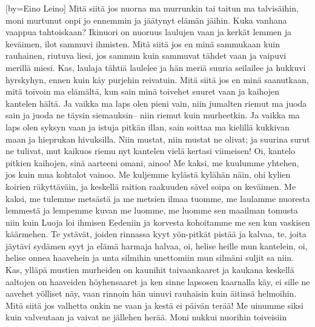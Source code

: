 \sclearpage
{}[by={Eino Leino}]
  \beginverse
    Mitä siitä jos nuorna ma murrunkin
    tai taitun ma talvisäihin,
    moni murtunut onpi jo ennemmin
    ja jäätynyt elämän jäihin.
    Kuka vanhana vaappua tahtoiskaan?
    Ikinuori on nuoruus laulujen vaan
    ja kerkät lemmen ja keväimen,
    ilot sammuvi ihmisten.
  \endverse
  \beginverse
    Mitä siitä jos en minä sammukaan
    kuin rauhainen, riutuva liesi,
    jos sammun kuin sammuvat tähdet vaan
    ja vaipuvi merillä miesi.
    Kas, laulaja tähtiä laulelee
    ja hän meriä suuria seilailee
    ja hukkuvi hyrskyhyn, ennen kuin
    käy purjehin reivatuin.
  \endverse
  \beginverse
    Mitä siitä jos en minä saanutkaan,
    mitä toivoin ma elämältä,
    kun sain minä toivehet suuret vaan
    ja kaihojen kantelen hältä.
    Ja vaikka ma laps olen pieni vain,
    niin jumalten riemut ma juoda sain
    ja juoda ne täysin siemauksin--
    niin riemut kuin murheetkin.
  \endverse
  \beginverse
    Ja vaikka ma laps olen syksyn vaan
    ja istuja pitkän illan,
    sain soittaa ma kielillä kukkivan maan
    ja hieprukan hivuksilla.
    Niin mustat, niin mustat ne olivat;
    ja suurina surut ne tulivat,
    mut kaikuos riemu nyt kantelen
    vielä kertasi viimeisen!
  \endverse
  \beginverse
    Oi, kantelo pitkien kaihojen,
    sinä aarteeni omani, ainoo!
    Me kaksi, me kuulumme yhtehen,
    jos kuin mua kohtalot vainoo.
    Me kuljemme kylästä kylähän näin,
    ohi kylien koirien räkyttäväin,
    ja keskellä raition raakuuden
    sävel soipa on keväimen.
  \endverse
  \beginverse
    Me kaksi, me tulemme metsästä
    ja me metsien ilmaa tuomme,
    me laulamme nuoresta lemmestä
    ja lempemme kuvan me luomme,
    me luomme sen maailman tomusta niin
    kuin Luoja loi ihmisen Eedeniin
    ja korvesta kohoitamme me sen
    kun vaskisen käärmehen.
  \endverse
  \beginverse
    Te ystävät, joiden rinnassa kyyt
    yön-pitkät pistää ja kalvaa,
    te, joita jäytävi sydämen syyt
    ja elämä harmaja halvaa,
    oi, helise heille mun kantelein,
    oi, helise onnea haavehein
    ja unta silmihin unettomiin
    mun silmäni suljit sa niin.
    Kas, ylläpä mustien murheiden
    on kaunihit taivaankaaret
    ja kaukana keskellä aaltojen
    on haaveiden höyhensaaret
    ja ken sinne lapsosen kaarnalla käy,
    ei sille ne aavehet yölliset näy,
    vaan rinnoin hän uinuvi rauhaisin
    kuin äitinsä helmoihin.
  \endverse
  \beginverse
    Mitä siitä jos valhetta onkin ne vaan
    ja kestä ei päivän terää!
    Me uinumme siksi kuin valveutaan
    ja vaivat ne jällehen herää.
    Moni nukkui nuorihin toiveisiin
